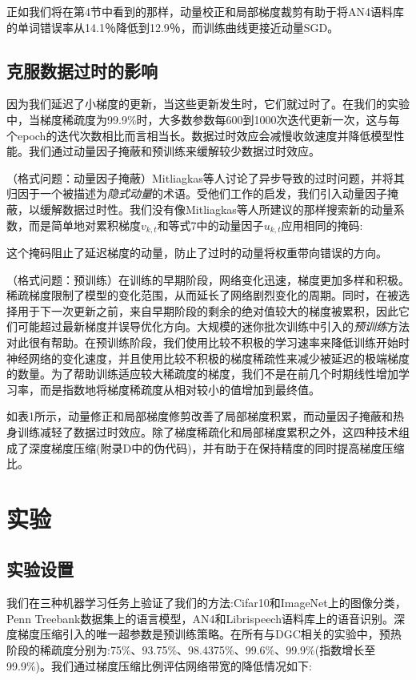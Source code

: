 正如我们将在第4节中看到的那样，动量校正和局部梯度裁剪有助于将AN4语料库的单词错误率从14.1％降低到12.9％，而训练曲线更接近动量SGD。

\subsection{克服数据过时的影响}
因为我们延迟了小梯度的更新，当这些更新发生时，它们就过时了。在我们的实验中，当梯度稀疏度为99.9\%时，大多数参数每600到1000次迭代更新一次，这与每个epoch的迭代次数相比而言相当长。数据过时效应会减慢收敛速度并降低模型性能。我们通过动量因子掩蔽和预训练来缓解较少数据过时效应。

（格式问题：动量因子掩蔽）Mitliagkas等人讨论了异步导致的过时问题，并将其归因于一个被描述为\textit{隐式动量}的术语。受他们工作的启发，我们引入动量因子掩蔽，以缓解数据过时性。我们没有像Mitliagkas等人所建议的那样搜索新的动量系数，而是简单地对累积梯度$v_{k,t}$和等式7中的动量因子$u_{k,t}$应用相同的掩码:

这个掩码阻止了延迟梯度的动量，防止了过时的动量将权重带向错误的方向。

（格式问题：预训练）在训练的早期阶段，网络变化迅速，梯度更加多样和积极。稀疏梯度限制了模型的变化范围，从而延长了网络剧烈变化的周期。同时，在被选择用于下一次更新之前，来自早期阶段的剩余的绝对值较大的梯度被累积，因此它们可能超过最新梯度并误导优化方向。大规模的迷你批次训练中引入的\textit{预训练}方法对此很有帮助。在预训练阶段，我们使用比较不积极的学习速率来降低训练开始时神经网络的变化速度，并且使用比较不积极的梯度稀疏性来减少被延迟的极端梯度的数量。为了帮助训练适应较大稀疏度的梯度，我们不是在前几个时期线性增加学习率，而是指数地将梯度稀疏度从相对较小的值增加到最终值。

如表1所示，动量修正和局部梯度修剪改善了局部梯度积累，而动量因子掩蔽和热身训练减轻了数据过时效应。除了梯度稀疏化和局部梯度累积之外，这四种技术组成了深度梯度压缩(附录D中的伪代码)，并有助于在保持精度的同时提高梯度压缩比。

\section{实验}
\subsection{实验设置}
我们在三种机器学习任务上验证了我们的方法:Cifar10和ImageNet上的图像分类，Penn Treebank数据集上的语言模型，AN4和Librispeech语料库上的语音识别。深度梯度压缩引入的唯一超参数是预训练策略。在所有与DGC相关的实验中，预热阶段的稀疏度分别为:75\%、93.75\%、98.4375\%、99.6\%、99.9\%(指数增长至99.9\%)。我们通过梯度压缩比例评估网络带宽的降低情况如下:

